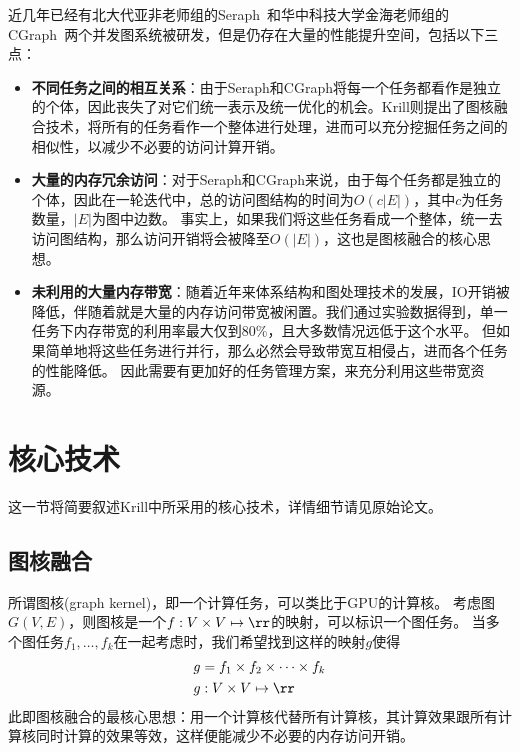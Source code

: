 \documentclass[logo,reportComp]{thesis}
\begin{document}
近几年已经有北大代亚非老师组的Seraph~\cite{xue:seraph_hpdc_2014}和华中科技大学金海老师组的CGraph~\cite{zhang:cgraph:_2018}两个并发图系统被研发，但是仍存在大量的性能提升空间，包括以下三点：
\begin{itemize}
	\item \textbf{不同任务之间的相互关系}：由于Seraph和CGraph将每一个任务都看作是独立的个体，因此丧失了对它们统一表示及统一优化的机会。Krill则提出了图核融合技术，将所有的任务看作一个整体进行处理，进而可以充分挖掘任务之间的相似性，以减少不必要的访问计算开销。
	\item \textbf{大量的内存冗余访问}：对于Seraph和CGraph来说，由于每个任务都是独立的个体，因此在一轮迭代中，总的访问图结构的时间为$O(c|E|)$，其中$c$为任务数量，$|E|$为图中边数。
	事实上，如果我们将这些任务看成一个整体，统一去访问图结构，那么访问开销将会被降至$O(|E|)$，这也是图核融合的核心思想。
	\item \textbf{未利用的大量内存带宽}：随着近年来体系结构和图处理技术的发展，IO开销被降低，伴随着就是大量的内存访问带宽被闲置。我们通过实验数据得到，单一任务下内存带宽的利用率最大仅到80\%，且大多数情况远低于这个水平。
	但如果简单地将这些任务进行并行，那么必然会导致带宽互相侵占，进而各个任务的性能降低。
	因此需要有更加好的任务管理方案，来充分利用这些带宽资源。
\end{itemize}

\section{核心技术}
这一节将简要叙述Krill中所采用的核心技术，详情细节请见原始论文。

\subsection{图核融合}
所谓图核(graph kernel)，即一个计算任务，可以类比于GPU的计算核。
考虑图$G(V,E)$，则图核是一个$f:V\times V\mapsto\rr$的映射，可以标识一个图任务。
当多个图任务$f_1,\ldots,f_k$在一起考虑时，我们希望找到这样的映射$g$使得
\begin{align}
g&=f_1\times f_2\times\cdots\times f_k\\
g&:V\times V\mapsto\rr
\end{align}
此即图核融合的最核心思想：用一个计算核代替所有计算核，其计算效果跟所有计算核同时计算的效果等效，这样便能减少不必要的内存访问开销。
\end{document}
